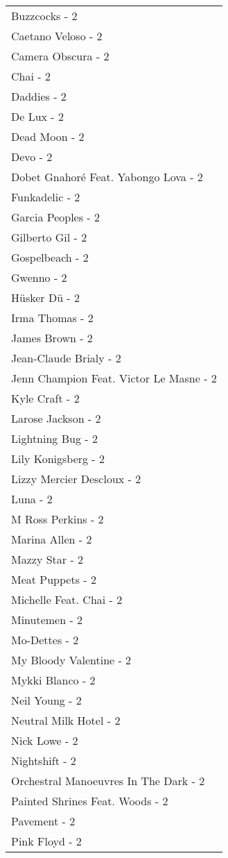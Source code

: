 \documentclass[
]{article}
\begin{document}
\begin{longtable}{l}
Buzzcocks - 2 \\ 
Caetano Veloso - 2 \\ 
Camera Obscura - 2 \\ 
Chai - 2 \\ 
Daddies - 2 \\ 
De Lux - 2 \\ 
Dead Moon - 2 \\ 
Devo - 2 \\ 
Dobet Gnahoré Feat. Yabongo Lova - 2 \\ 
Funkadelic - 2 \\ 
Garcia Peoples - 2 \\ 
Gilberto Gil - 2 \\ 
Gospelbeach - 2 \\ 
Gwenno - 2 \\ 
Hüsker Dü - 2 \\ 
Irma Thomas - 2 \\ 
James Brown - 2 \\ 
Jean-Claude Brialy - 2 \\ 
Jenn Champion Feat. Victor Le Masne - 2 \\ 
Kyle Craft - 2 \\ 
Larose Jackson - 2 \\ 
Lightning Bug - 2 \\ 
Lily Konigsberg - 2 \\ 
Lizzy Mercier Descloux - 2 \\ 
Luna - 2 \\ 
M Ross Perkins - 2 \\ 
Marina Allen - 2 \\ 
Mazzy Star - 2 \\ 
Meat Puppets - 2 \\ 
Michelle Feat. Chai - 2 \\ 
Minutemen - 2 \\ 
Mo-Dettes - 2 \\ 
My Bloody Valentine - 2 \\ 
Mykki Blanco - 2 \\ 
Neil Young - 2 \\ 
Neutral Milk Hotel - 2 \\ 
Nick Lowe - 2 \\ 
Nightshift - 2 \\ 
Orchestral Manoeuvres In The Dark - 2 \\ 
Painted Shrines Feat. Woods - 2 \\ 
Pavement - 2 \\ 
Pink Floyd - 2 \\ 

\end{longtable}
\end{document}

